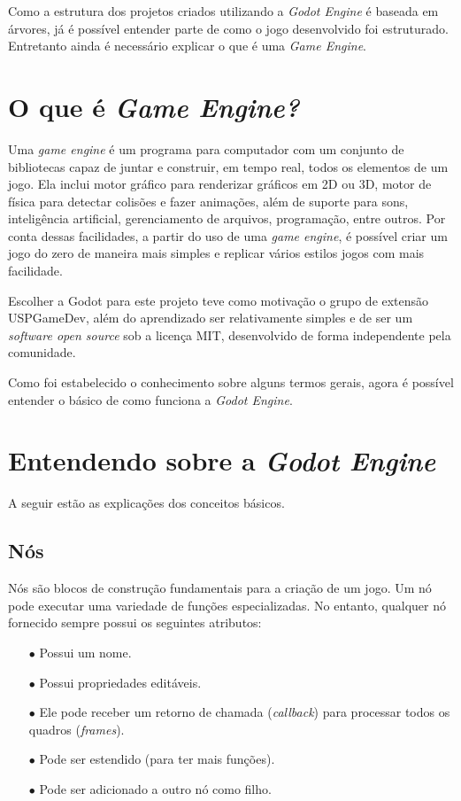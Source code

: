 Como a estrutura dos projetos criados utilizando a \textit{Godot Engine} é 
baseada em árvores, já é possível entender parte de como o jogo desenvolvido foi 
estruturado. Entretanto ainda é necessário explicar o que é uma 
\textit{Game Engine}.


\section{O que é \textit{Game Engine?}}

Uma \textit{game engine} é um programa para computador com um conjunto de 
bibliotecas capaz de juntar e construir, em tempo real, todos os elementos de um
jogo.
Ela inclui motor gráfico para renderizar gráficos em 2D ou 3D, motor de física 
para detectar colisões e fazer animações, além de suporte para sons, 
inteligência artificial, gerenciamento de arquivos, programação, entre outros.
Por conta dessas facilidades, a partir do uso de uma \textit{game engine}, é 
possível criar um jogo do zero de maneira mais simples e replicar vários estilos
jogos com mais facilidade.

Escolher a Godot para este projeto teve como motivação o grupo de extensão 
USPGameDev, além do aprendizado ser relativamente simples e de ser um 
\textit{software open source} sob a licença MIT, desenvolvido de forma 
independente pela comunidade.

Como foi estabelecido o conhecimento sobre alguns termos gerais, agora é
possível entender o básico de como funciona a \textit{Godot Engine}.

\section{Entendendo sobre a \textit{Godot Engine}}

A seguir estão as explicações dos conceitos básicos.

\subsection{Nós}

Nós são blocos de construção fundamentais para a criação de um jogo. Um nó pode
executar uma variedade de funções especializadas.
No entanto, qualquer nó fornecido sempre possui os seguintes atributos:
\begin{itemize}
    \item[$\bullet$]
        Possui um nome.
    \item[$\bullet$]
        Possui propriedades editáveis.
    \item[$\bullet$]
        Ele pode receber um retorno de chamada (\textit{callback}) para 
        processar todos os quadros (\textit{frames}).
    \item[$\bullet$]
        Pode ser estendido (para ter mais funções).
    \item[$\bullet$]
        Pode ser adicionado a outro nó como filho.
\end{itemize}

